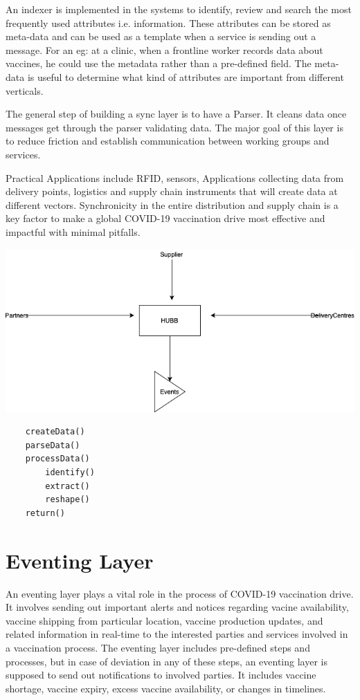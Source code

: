 \documentclass{article}
\begin{document}
An indexer is implemented in the systems to identify, review and search the most frequently used attributes i.e. information. These attributes can be stored as meta-data and can be used as a template when a service is sending out a message. For an eg: at a clinic, when a frontline worker records data about vaccines, he could use the metadata rather than a pre-defined field. The meta-data is useful to determine what kind of attributes are important from different verticals.

The general step of building a sync layer is to have a Parser. It cleans data once messages get through the parser validating data. The major goal of this layer is to reduce friction and establish communication between working groups and services.

Practical Applications include RFID, sensors, Applications collecting data from delivery points, logistics and supply chain instruments that will create data at different vectors. Synchronicity in the entire distribution and supply chain is a key factor to make a global COVID-19 vaccination drive most effective and impactful with minimal pitfalls.

\includegraphics[scale=0.5]{hubb}

\begin{lstlisting}
	createData()
	parseData()
	processData()
		identify()
		extract()
		reshape()
	return()	
\end{lstlisting}

   
\section{Eventing Layer}

An eventing layer plays a vital role in the process of COVID-19 vaccination drive. It involves sending out important alerts and notices regarding vacine availability, vaccine shipping from particular location, vaccine production updates, and related information in real-time to the interested parties and services involved in a vaccination process. The eventing layer includes pre-defined steps and processes, but in case of deviation in any of these steps, an eventing layer is supposed to send out notifications to involved parties. It includes vaccine shortage, vaccine expiry, excess vaccine availability, or changes in timelines.
\end{document}

